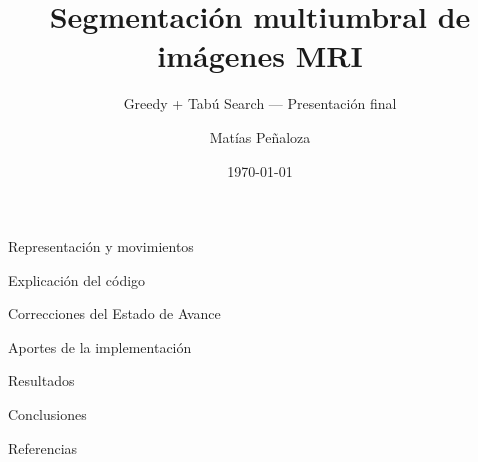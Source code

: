 \documentclass[aspectratio=169, 10pt]{beamer}
\title{Segmentación multiumbral de imágenes MRI}
\subtitle{Greedy + Tabú Search --- Presentación final}
\author{Matías Peñaloza}
\institute{Inteligencia Artificial 2026-2}
\date{\today}
\begin{document}
\begin{frame}
  \titlepage
\end{frame}

\begin{frame}{Representación y movimientos}
\end{frame}

\begin{frame}{Explicación del código}
\end{frame}

\begin{frame}{Correcciones del Estado de Avance}
\end{frame}

\begin{frame}{Aportes de la implementación}
\end{frame}

\begin{frame}{Resultados}
\end{frame}

\begin{frame}{Conclusiones}
\end{frame}

\begin{frame}[allowframebreaks]{Referencias}
  \nocite{Otsu1979, Hammouche2010Comparative, Liao2001Fast}
  
  
\end{frame}
\end{document}
